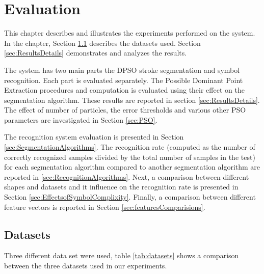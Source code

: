 \chapter{Evaluation}
\label{sec:Evaluation}
This chapter describes and illustrates the experiments performed on the system. In the chapter, Section \ref{sec:Datasets} describes the datasets used. Section \ref{sec:ResultsDetails} demonstrates and analyzes the results. 

The system has two main parts the DPSO stroke segmentation and symbol recognition. Each part is evaluated separately. The Possible Dominant Point Extraction procedures and computation is evaluated using their effect on the segmentation algorithm. These results are reported in section \ref{sec:ResultsDetails}. The effect of number of particles, the error thresholds and various other PSO parameters are investigated in Section \ref{sec:PSO}. %

The recognition system evaluation is presented in Section \ref{sec:SegmentationAlgorithms}. The recognition rate (computed as the number of correctly recognized samples divided by the total number of samples in the test) for each segmentation algorithm compared to another segmentation algorithm are reported in \ref{sec:RecognitionAlgorithms}. Next, a comparison between different shapes and datasets and it influence on the recognition rate is presented in Section \ref{sec:EffectsofSymbolComplixity}. Finally, a comparison between different feature vectors is reported in Section \ref{sec:featuresComparisions}.

\section{Datasets}
\label{sec:Datasets}
Three different data set were used, table \ref{tab:datasets} shows a comparison between the three datasets used in our experiments. 

